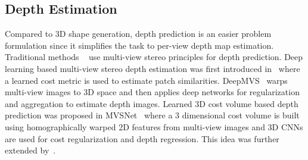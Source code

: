 \subsection{Depth Estimation}
Compared to 3D shape generation, depth prediction is an easier problem formulation since it simplifies the task to per-view depth map estimation.
Traditional methods ~\cite{campbell2008using,galliani2015massively,schonberger2016pixelwise} use multi-view stereo principles for depth prediction.
Deep learning based multi-view stereo depth estimation was first introduced in~\cite{hartmann2017learned_16} where a learned cost metric is used to estimate patch similarities.
DeepMVS~\cite{deepmvs2018} warps multi-view images to 3D space and then applies deep networks for regularization and aggregation to estimate depth images.
Learned 3D cost volume based depth prediction was proposed in MVSNet~\cite{yao2018mvsnet} where a 3 dimensional cost volume is built using homographically warped 2D features from multi-view images and 3D CNNs are used for cost regularization and depth regression.
This idea was further extended by~\cite{chen2019point,luo2019pmvsnet, gu2019cascade,yao2019recurrent}.

